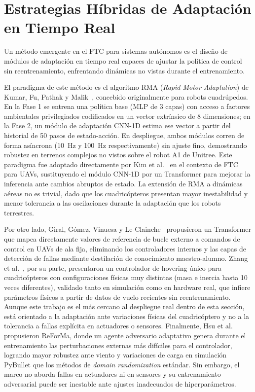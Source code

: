 \section{Estrategias Híbridas de Adaptación en Tiempo Real}


Un método emergente en el FTC para sistemas autónomos es el diseño de módulos de adaptación en tiempo real capaces de ajustar la política de control sin reentrenamiento, enfrentando dinámicas no vistas durante el entrenamiento.

El paradigma de este método es el algoritmo RMA (\textit{Rapid Motor Adaptation}) de Kumar, Fu, Pathak y Malik~\cite{kumar2021}, concebido originalmente para robots cuadrúpedos. En la Fase 1 se entrena una política base (MLP de 3 capas) con acceso a factores ambientales privilegiados codificados en un vector extrínsico de 8 dimensiones; en la Fase 2, un módulo de adaptación CNN-1D estima ese vector a partir del historial de 50 pasos de estado-acción. En despliegue, ambos módulos corren de forma asíncrona (10~Hz y 100~Hz respectivamente) sin ajuste fino, demostrando robustez en terrenos complejos no vistos sobre el robot A1 de Unitree. Este paradigma fue adoptado directamente por Kim et al.~\cite{kim2025} en el contexto de FTC para UAVs, sustituyendo el módulo CNN-1D por un Transformer para mejorar la inferencia ante cambios abruptos de estado. La extensión de RMA a dinámicas aéreas no es trivial, dado que los cuadricópteros presentan mayor inestabilidad y menor tolerancia a las oscilaciones durante la adaptación que los robots terrestres.

Por otro lado, Giral, Gómez, Vinuesa y Le-Clainche~\cite{giral2024} propusieron un Transformer que mapea directamente valores de referencia de bucle externo a comandos de control en UAVs de ala fija, eliminando los controladores internos y las capas de detección de fallas mediante destilación de conocimiento maestro-alumno. Zhang et al.~\cite{zhang2023}, por su parte, presentaron un controlador de hovering único para cuadricópteros con configuraciones físicas muy distintas (masa e inercia hasta 10 veces diferentes), validado tanto en simulación como en hardware real, que infiere parámetros físicos a partir de datos de vuelo recientes sin reentrenamiento. Aunque este trabajo es el más cercano al despliegue real dentro de esta sección, está orientado a la adaptación ante variaciones físicas del cuadricóptero y no a la tolerancia a fallas explícita en actuadores o sensores. Finalmente, Hsu et al.~\cite{hsu2024} propusieron ReForMa, donde un agente adversario adaptativo genera durante el entrenamiento las perturbaciones externas más difíciles para el controlador, logrando mayor robustez ante viento y variaciones de carga en simulación PyBullet que los métodos de \textit{domain randomization} estándar. Sin embargo, el marco no aborda fallas en actuadores ni en sensores y su entrenamiento adversarial puede ser inestable ante ajustes inadecuados de hiperparámetros.



